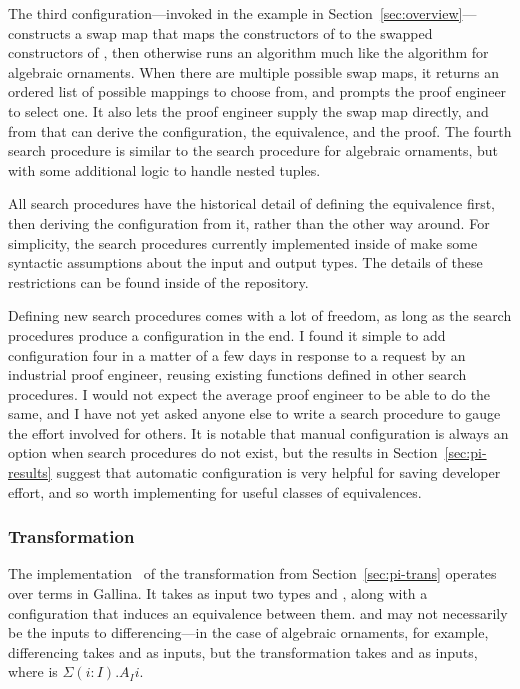 The third configuration---invoked in the example in Section~\ref{sec:overview}---constructs a swap map
that maps the constructors of \Aa to the swapped constructors of \B, then otherwise runs an algorithm much like
the algorithm for algebraic ornaments.
When there are multiple possible swap maps, it returns an ordered list of possible mappings to choose from,
and prompts the proof engineer to select one. %
It also lets the proof engineer supply the swap map directly, and from that can derive the configuration, the equivalence, and the proof.
The fourth search procedure is similar to the search procedure for algebraic ornaments, but with some additional logic
to handle nested tuples.

All search procedures have the historical detail of defining the equivalence first, then deriving the configuration from it,
rather than the other way around.
For simplicity, the search procedures currently implemented inside of \toolnamec make some syntactic assumptions
about the input and output types.
The details of these restrictions can be found inside of the repository. %

Defining new search procedures comes with a lot of freedom, as long as the search procedures produce a configuration in the end.
I found it simple to add configuration four in a matter of a few days in response to a request by an industrial proof engineer,
reusing existing functions defined in other search procedures.
I would not expect the average proof engineer to be able to do the same, and I have not yet asked anyone else to write a search procedure
to gauge the effort involved for others.
It is notable that manual configuration is always an option when search procedures do not exist,
but the results in Section~\ref{sec:pi-results} suggest that automatic configuration is very helpful for saving developer effort,
and so worth implementing for useful classes of equivalences.

\subsubsection{Transformation}
\label{sec:pi-details-trans}

The implementation~\href{https://github.com/uwplse/pumpkin-pi/blob/v2.0.0/plugin/src/automation/lift/lift.ml}{}
of the transformation from Section~\ref{sec:pi-trans} operates over terms in Gallina.
It takes as input two types \Aa and \B, along with a configuration that induces an equivalence between them.
\Aa and \B may not necessarily be the inputs to differencing---in the case of algebraic ornaments, for example,
differencing takes \Aa and \AI as inputs, but the transformation takes \Aa and \B as inputs,
where \B is $\Sigma (i : I).A_I i$.

